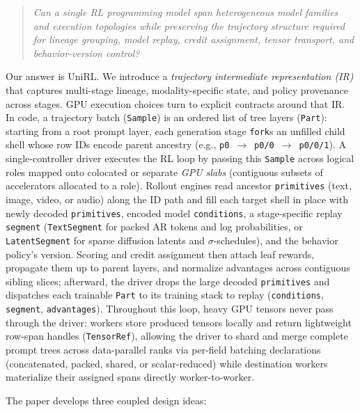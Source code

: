 \documentclass[10pt]{article}
\newcommand{\sample}{\texttt{Sample}}
\newcommand{\parttype}{\texttt{Part}}
\begin{document}
\begin{quote}
\emph{Can a single RL programming model span heterogeneous model families and execution topologies while preserving the trajectory structure required for lineage grouping, model replay, credit assignment, tensor transport, and behavior-version control?}
\end{quote}

Our answer is UniRL. We introduce a \emph{trajectory intermediate representation (IR)} that captures multi-stage lineage, modality-specific state, and policy provenance across stages. GPU execution choices turn to explicit contracts around that IR.
In code, a trajectory batch (\sample{}) is an ordered list of tree layers (\parttype{}): starting from a root prompt layer, each generation stage \texttt{fork}s an unfilled child shell whose row IDs encode parent ancestry (e.g., \texttt{p0}~$\rightarrow$~\texttt{p0/0}~$\rightarrow$~\texttt{p0/0/1}).
A single-controller driver executes the RL loop by passing this \sample{} across logical roles mapped onto colocated or separate \emph{GPU slabs} (contiguous subsets of accelerators allocated to a role).
Rollout engines read ancestor \texttt{primitives} (text, image, video, or audio) along the ID path and fill each target shell in place with newly decoded \texttt{primitives}, encoded model \texttt{conditions}, a stage-specific replay \texttt{segment} (\texttt{TextSegment} for packed AR tokens and log probabilities, or \texttt{LatentSegment} for sparse diffusion latents and $\sigma$-schedules), and the behavior policy's version.
Scoring and credit assignment then attach leaf rewards, propagate them up to parent layers, and normalize advantages across contiguous sibling slices; afterward, the driver drops the large decoded \texttt{primitives} and dispatches each trainable \parttype{} to its training stack to replay (\texttt{conditions}, \texttt{segment}, \texttt{advantages}).
Throughout this loop, heavy GPU tensors never pass through the driver: workers store produced tensors locally and return lightweight row-span handles (\texttt{TensorRef}), allowing the driver to shard and merge complete prompt trees across data-parallel ranks via per-field batching declarations (concatenated, packed, shared, or scalar-reduced) while destination workers materialize their assigned spans directly worker-to-worker.

The paper develops three coupled design ideas:
\end{document}
